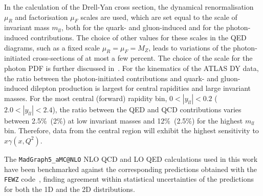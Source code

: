 In the  calculation of the Drell-Yan cross section, the
dynamical renormalisation $\mu_{R}$ and factorisation $\mu_{F}$
scales are used, which are set equal to the scale of invariant mass $m_{ll}$,
both for the quark- and gluon-induced and for the photon-induced
contributions.
%
The choice of other values for these scales in the QED diagrams,
such as a fixed scale $\mu_R=\mu_F=M_Z$, leads 
to  variations of the photon-initiated cross-sections of at most a few percent.
%
The choice of the scale for the photon PDF  is further discussed
in~\cite{Harland-Lang:2016lhw,Dittmaier:2009cr}.
%
For the kinematics of the ATLAS DY data, the ratio between the photon-initiated
contributions and  quark- and gluon-induced dilepton production is largest
for central rapidities and large invariant masses. 
%
For the most central (forward) rapidity
bin, $0 < |y_{ll}| < 0.2$ ($2.0 < |y_{ll}| < 2.4$), the ratio
between the QED and QCD contributions varies between 2.5\%~(2\%) at low
invariant masses and 12\%~(2.5\%) for the highest $m_{ll}$ bin.
%
Therefore, data from the central region will exhibit the highest
sensitivity to $x\gamma(x,Q^2)$.

The {\tt MadGraph5{\_}aMC@NLO} NLO QCD and LO QED calculations used in this work have been
benchmarked against the corresponding predictions  obtained with the {\tt FEWZ}
code~\cite{Gavin:2012sy}, finding agreement within statistical uncertainties of
the predictions for both the 1D and the 2D distributions.

